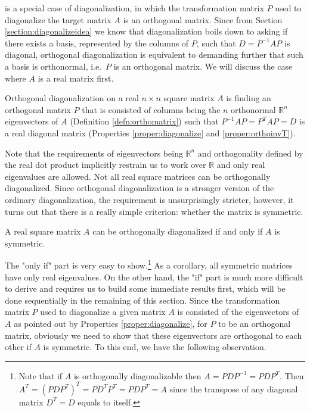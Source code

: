  is a special case of diagonalization, in which the transformation matrix $P$ used to diagonalize the target matrix $A$ is an orthogonal matrix. Since from Section \ref{section:diagonalizeidea} we know that diagonalization boils down to asking if there exists a basis, represented by the columns of $P$, such that $D = P^{-1}AP$ is diagonal, orthogonal diagonalization is equivalent to demanding further that such a basis is orthonormal, i.e.\ $P$ is an orthogonal matrix. We will discuss the case where $A$ is a real matrix first.
\begin{defn}
\label{defn:orthodiagonal}
Orthogonal diagonalization on a real $n \times n$ square matrix $A$ is finding an orthogonal matrix $P$ that is consisted of columns being the $n$ orthonormal $\mathbb{R}^n$ eigenvectors of $A$ (Definition \ref{defn:orthomatrix}) such that $P^{-1}AP = P^TAP = D$ is a real diagonal matrix (Properties \ref{proper:diagonalize} and \ref{proper:orthoinvT}).
\end{defn}
Note that the requirements of eigenvectors being $\mathbb{R}^n$ and orthogonality defined by the real dot product implicitly restrain us to work over $\mathbb{R}$ and only real eigenvalues are allowed. Not all real square matrices can be orthogonally diagonalized. Since orthogonal diagonalization is a stronger version of the ordinary diagonalization, the requirement is unsurprisingly stricter, however, it turns out that there is a really simple criterion: whether the matrix is symmetric.
\begin{thm}
\label{thm:symdiag}
A real square matrix $A$ can be orthogonally diagonalized if and only if $A$ is symmetric.
\end{thm}
The "only if" part is very easy to show.\footnote{Note that if $A$ is orthogonally diagonalizable then $A = PDP^{-1} = PDP^T$. Then $A^T = (PDP^T)^T = PD^TP^T = PDP^T = A$ since the transpose of any diagonal matrix $D^T = D$ equals to itself.} As a corollary, all symmetric matrices have only real eigenvalues. On the other hand, the "if" part is much more difficult to derive and requires us to build some immediate results first, which will be done sequentially in the remaining of this section. Since the transformation matrix $P$ used to diagonalize a given matrix $A$ is consisted of the eigenvectors of $A$ as pointed out by Properties \ref{proper:diagonalize}, for $P$ to be an orthogonal matrix, obviously we need to show that these eigenvectors are orthogonal to each other if $A$ is symmetric. To this end, we have the following observation.
